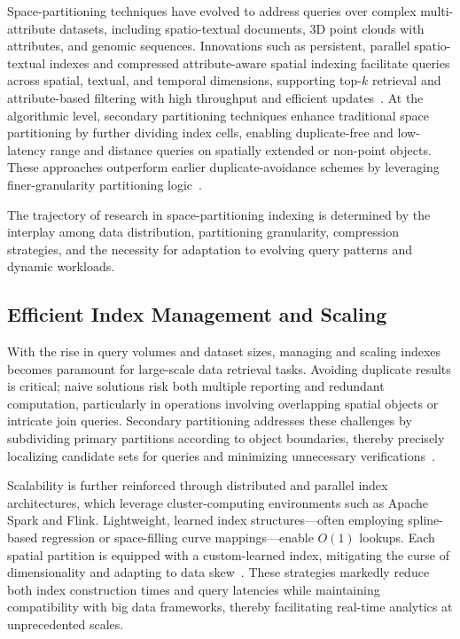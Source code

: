 \documentclass[sigconf]{acmart}
\begin{document}
Space-partitioning techniques have evolved to address queries over complex multi-attribute datasets, including spatio-textual documents, 3D point clouds with attributes, and genomic sequences. Innovations such as persistent, parallel spatio-textual indexes and compressed attribute-aware spatial indexing facilitate queries across spatial, textual, and temporal dimensions, supporting top-$k$ retrieval and attribute-based filtering with high throughput and efficient updates~\cite{ref50,ref51,ref75,ref98,ref114,ref118}. At the algorithmic level, secondary partitioning techniques enhance traditional space partitioning by further dividing index cells, enabling duplicate-free and low-latency range and distance queries on spatially extended or non-point objects. These approaches outperform earlier duplicate-avoidance schemes by leveraging finer-granularity partitioning logic~\cite{ref114}.

The trajectory of research in space-partitioning indexing is determined by the interplay among data distribution, partitioning granularity, compression strategies, and the necessity for adaptation to evolving query patterns and dynamic workloads.

\subsection{Efficient Index Management and Scaling}

With the rise in query volumes and dataset sizes, managing and scaling indexes becomes paramount for large-scale data retrieval tasks. Avoiding duplicate results is critical; naive solutions risk both multiple reporting and redundant computation, particularly in operations involving overlapping spatial objects or intricate join queries. Secondary partitioning addresses these challenges by subdividing primary partitions according to object boundaries, thereby precisely localizing candidate sets for queries and minimizing unnecessary verifications~\cite{ref114}.

Scalability is further reinforced through distributed and parallel index architectures, which leverage cluster-computing environments such as Apache Spark and Flink. Lightweight, learned index structures---often employing spline-based regression or space-filling curve mappings---enable $O(1)$ lookups. Each spatial partition is equipped with a custom-learned index, mitigating the curse of dimensionality and adapting to data skew~\cite{ref51,ref111}. These strategies markedly reduce both index construction times and query latencies while maintaining compatibility with big data frameworks, thereby facilitating real-time analytics at unprecedented scales.
\end{document}
